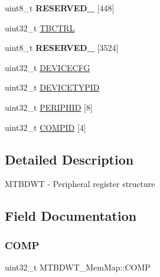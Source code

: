 \begin{DoxyCompactItemize}
\begin{tabbing}
\end{tabbing}\item 
\mbox{\label{struct_m_t_b_d_w_t___mem_map_aafe008f8a3ddd6bb4b58dc3309fad883}} 
uint8\+\_\+t {\bfseries R\+E\+S\+E\+R\+V\+E\+D\+\_} \mbox{[}448\mbox{]}
\item 
uint32\+\_\+t \hyperlink{struct_m_t_b_d_w_t___mem_map_a2d08a9ac507db96efebd284e02f0efe9}{T\+B\+C\+T\+RL}
\item 
\mbox{\label{struct_m_t_b_d_w_t___mem_map_a87be1a8207dafcd8e23d78b12b05fb64}} 
uint8\+\_\+t {\bfseries R\+E\+S\+E\+R\+V\+E\+D\+\_} \mbox{[}3524\mbox{]}
\item 
uint32\+\_\+t \hyperlink{struct_m_t_b_d_w_t___mem_map_a836782ca35496627b905b98747e750c9}{D\+E\+V\+I\+C\+E\+C\+FG}
\item 
uint32\+\_\+t \hyperlink{struct_m_t_b_d_w_t___mem_map_a86a983ab8675b605e5769d98195ed8fd}{D\+E\+V\+I\+C\+E\+T\+Y\+P\+ID}
\item 
uint32\+\_\+t \hyperlink{struct_m_t_b_d_w_t___mem_map_a59a2401dc9511e3c87fcc5c2a9867f49}{P\+E\+R\+I\+P\+H\+ID} \mbox{[}8\mbox{]}
\item 
uint32\+\_\+t \hyperlink{struct_m_t_b_d_w_t___mem_map_a4a32a81244f65ec304572767d33fcbce}{C\+O\+M\+P\+ID} \mbox{[}4\mbox{]}
\end{DoxyCompactItemize}


\subsection{Detailed Description}
M\+T\+B\+D\+WT -\/ Peripheral register structure 

\subsection{Field Documentation}
\mbox{\label{struct_m_t_b_d_w_t___mem_map_a2dc253306d19e9f365e7ac79eecb8f07}} 
\subsubsection{\texorpdfstring{C\+O\+MP}{COMP}}
{\footnotesize\ttfamily uint32\+\_\+t M\+T\+B\+D\+W\+T\+\_\+\+Mem\+Map\+::\+C\+O\+MP}

